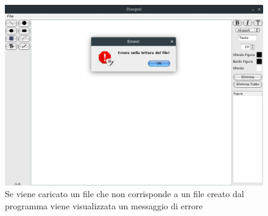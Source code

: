 \documentclass[a4paper,12pt,times,numbered,print,index]{article}
\begin{document}
\begin{figure}[4]
  \includegraphics[scale=.5]{Immagini/Debug/test5.png}
  \caption[Caricamento File]{Se viene caricato un file che non corrisponde a un file creato dal programma viene visualizzata un messaggio di errore}
\end{figure}

\printbibliography
\end{document}
